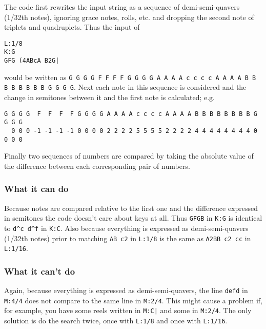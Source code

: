 The code first rewrites the input string as a sequence of demi-semi-quavers
(1/32th notes), ignoring grace notes, rolls, etc. and dropping the second note
of triplets and quadruplets. Thus the input of
\begin{verbatim}
L:1/8
K:G
GFG (4ABcA B2G|
\end{verbatim}
would be written as
{\tt G G G G F F F F G G G G A A A A c c c c A A A A B B B B B B B B G G G G}.
Next each note in this sequence is considered and the change in semitones
between it and the first note is calculated; e.g.
\begin{verbatim}
G G G G  F  F  F  F G G G G A A A A c c c c A A A A B B B B B B B B G G G G
  0 0 0 -1 -1 -1 -1 0 0 0 0 2 2 2 2 5 5 5 5 2 2 2 2 4 4 4 4 4 4 4 4 0 0 0 0
\end{verbatim}
Finally two sequences of numbers are compared by taking the absolute value
of the difference between each corresponding pair of numbers.

\subsubsection{What it can do}

Because notes are compared relative to the
first
one and the difference expressed in semitones the code doesn't care about keys
at all. Thus {\tt GFGB} in {\tt K:G} is identical to \verb+d^c d^f+ in
{\tt K:C}. Also because everything is expressed as demi-semi-quavers
(1/32th notes)
prior to matching {\tt AB c2} in {\tt L:1/8} is the same as {\tt A2BB c2 cc}
in {\tt L:1/16}.

\subsubsection{What it can't do}

Again, because everything is expressed as demi-semi-quavers, the line
{\tt defd} in {\tt M:4/4} does not compare to the same line in {\tt M:2/4}.
This might cause a problem if, for example, you have some reels written in
{\tt M:C|} and some in {\tt M:2/4}. The only solution is do the search twice,
once with {\tt L:1/8} and once with {\tt L:1/16}.



